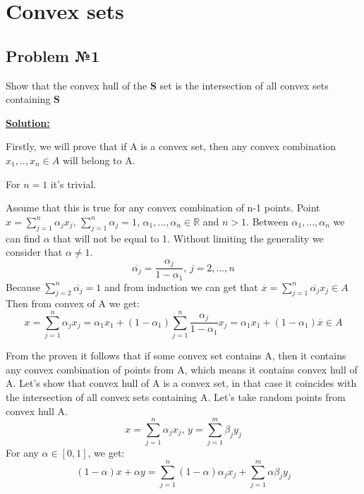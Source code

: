 \section{Convex sets}

\subsection{Problem №1}

Show that the convex hull of the $\mathbf{S}$ set is the intersection of all convex sets containing $\mathbf{S}$

\underline{\textbf{Solution:}}

Firstly, we will prove that if A is a convex set, then any convex combination $x_1, .., x_n \in A$ will belong to A.

For $n = 1$ it's trivial.

Assume that this is true for any convex combination of n-1 points. Point $x = \sum\limits_{j=1}^n\alpha_j x_j$, $\sum\limits_{j=1}^n\alpha_j = 1$, $\alpha_1, ..., \alpha_n \in \mathds{R}$ and $n > 1$. Between $\alpha_1, ..., \alpha_n$ we can find $\alpha$ that will not be equal to 1. Without limiting the generality we consider that $\alpha \not = 1$.
\begin{equation*}
    \overline{\alpha_j} = \frac{\alpha_j}{1-\alpha_1}\text{, }j = 2, ..., n
\end{equation*}
Because $    \sum\limits_{j=2}^n\overline{\alpha_j} = 1 $
and from induction we can get that $ \overline{x} = \sum\limits_{j=1}^n\overline{\alpha_j}x_j \in A $
Then from convex of A we get:
\begin{equation*}
    x = \sum\limits_{j=1}^n\alpha_jx_j = \alpha_1x_1 + (1-\alpha_1)\sum\limits_{j=1}^n\frac{\alpha_j}{1-\alpha_1}x_j = \alpha_1 x_1 + (1-\alpha_1)\overline{x} \in A
\end{equation*}

From the proven it follows that if some convex set contains A, then it contains any convex combination of points from A, which means it contains convex hull of A. Let's show that convex hull of A is a convex set, in that case it coincides with the intersection of all convex sets containing A. Let's take random points from convex hull A. 
\begin{equation*}
    x = \sum\limits_{j=1}^n \alpha_jx_j \text{, } y = \sum\limits_{j = 1}^m \beta_jy_j
\end{equation*}
For any $\alpha \in [0, 1]$, we get:
\begin{equation*}
    (1-\alpha)x + \alpha y =\sum\limits_{j=1}^n(1-\alpha)\alpha_jx_j + \sum\limits_{j=1}^m\alpha \beta_j y_j
\end{equation*}

